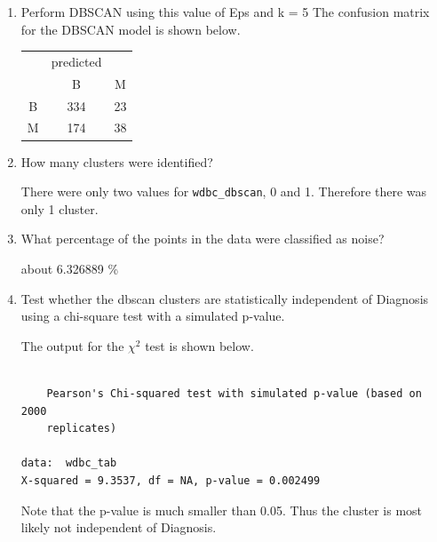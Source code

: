 \documentclass[11pt]{article}
\begin{document}
\begin{enumerate}
\begin{enumerate}
\item
 Perform DBSCAN using this value of Eps and k = 5
%
%
The confusion matrix for the DBSCAN model is shown below. 

\begin{center}
\begin{tabular}{c c c}
  & predicted & \\
    &  B  &  M \\
  B & 334 &  23 \\
  M & 174 &  38 \\
\end{tabular}
\end{center}

\item How many clusters were identified? 

There were only two values for \verb|wdbc_dbscan|, 0 and 1. Therefore there was only 
1 cluster. 

\item What percentage of the points in the data were classified as noise? 

about 6.326889 \% 

\item
 Test whether the dbscan clusters are statistically independent of 
 Diagnosis using a chi-square test with a simulated p-value. 

The output for the $\chi^2$ test is shown below.
\begin{Verbatim}

	Pearson's Chi-squared test with simulated p-value (based on 2000
	replicates)

data:  wdbc_tab
X-squared = 9.3537, df = NA, p-value = 0.002499
\end{Verbatim}
Note that the p-value is much smaller than 0.05. Thus the cluster is 
most likely not independent of Diagnosis. 

\end{enumerate}

\end{enumerate}
\end{document}

